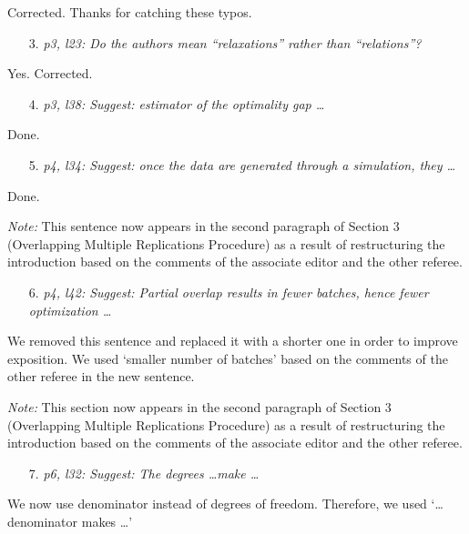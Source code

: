 \documentclass[11pt,notitlepage,onecolumn]{article}
\newcommand{\noi}{\noindent}
\begin{document}
\noindent 
Corrected. Thanks for catching these typos.
\medskip 


\begin{itemize}
\item[3.] \textit{p3, l23: Do the authors mean ``relaxations'' rather than ``relations''?}
\end{itemize}

\noindent 
Yes. Corrected. 
\medskip 


\begin{itemize}
\item[4.] \textit{p3, l38: Suggest: estimator of the optimality gap \ldots}
\end{itemize}

\noindent 
Done.
\medskip 


\begin{itemize}
\item[5.] \textit{p4, l34: Suggest: once the data are generated through a simulation, they \ldots}
\end{itemize}

\noindent 
Done. 
\smallskip 

\noi 
{\it Note:} This sentence now appears in the second paragraph of Section 3 (Overlapping Multiple Replications Procedure) as a result of restructuring the introduction based on the comments of the associate editor and the other referee. 
\medskip 


\begin{itemize}
\item[6.] \textit{p4, l42: Suggest: Partial overlap results in fewer batches, hence fewer optimization \ldots}
\end{itemize}

\noindent 
We removed this sentence and replaced it with a shorter one in order to improve exposition. 
We used `smaller number of batches' based on the comments of the other referee in the new sentence. 
\smallskip 

\noi 
{\it Note:} This section now appears in the second paragraph of Section 3 (Overlapping Multiple Replications Procedure) as a result of restructuring the introduction based on the comments of the associate editor and the other referee. 
\medskip 


\begin{itemize}
\item[7.] \textit{p6, l32: Suggest: The degrees \ldots make \ldots}
\end{itemize}

\noindent 
We now use denominator instead of degrees of freedom. 
Therefore, we used `\ldots denominator makes \ldots '
\medskip 
\end{document}
